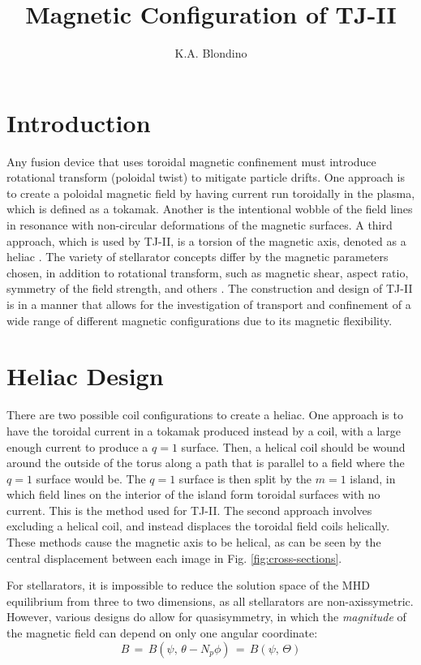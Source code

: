 \documentclass[a4paper]{article}
\author{K.A. Blondino}
\title{Magnetic Configuration of TJ-II}
\begin{document}
\maketitle
\section*{Introduction}
Any fusion device that uses toroidal magnetic confinement must introduce rotational transform (poloidal twist) to mitigate particle drifts.
One approach is to create a poloidal magnetic field by having current run toroidally in the plasma, which is defined as a tokamak.
Another is the intentional wobble of the field lines in resonance with non-circular deformations of the magnetic surfaces.
A third approach, which is used by TJ-II, is a torsion of the magnetic axis, denoted as a heliac \cite{boozer_what_1998}.
The variety of stellarator concepts differ by the magnetic parameters chosen, in addition to rotational transform, such as magnetic shear, aspect ratio, symmetry of the field strength, and others \cite{iaea_fusion_2012}.
The construction and design of TJ-II is in a manner that allows for the investigation of transport and confinement of a wide range of different magnetic configurations due to its magnetic flexibility.


\section*{Heliac Design}
There are two possible coil configurations to create a heliac.
One approach is to have the toroidal current in a tokamak produced instead by a coil, with a large enough current to produce a $q = 1$ surface.
Then, a helical coil should be wound around the outside of the torus along a path that is parallel to a field where the $q = 1$ surface would be.
The $q = 1$ surface is then split by the $m = 1$ island, in which field lines on the interior of the island form toroidal surfaces with no current.
This is the method used for TJ-II.
The second approach involves excluding a helical coil, and instead displaces the toroidal field coils helically\cite{boozer_what_1998}.
These methods cause the magnetic axis to be helical, as can be seen by the central displacement between each image in Fig. \ref{fig:cross-sections}.

For stellarators, it is impossible to reduce the solution space of the MHD equilibrium from three to two dimensions, as all stellarators are non-axissymetric.
However, various designs do allow for quasisymmetry, in which the \emph{magnitude} of the magnetic field can depend on only one angular coordinate:
\begin{equation}
	B \,=\, B(\psi,\,\theta - N_p\phi) \,=\, B(\psi,\,\Theta)
\end{equation}
\end{document}
